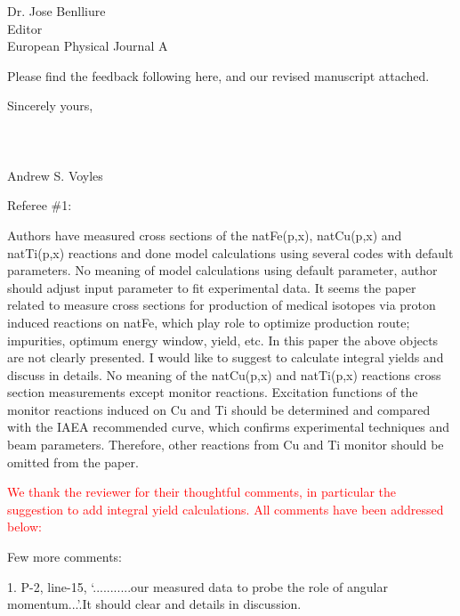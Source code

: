 \documentclass{letter} %
\newcommand{\colornote}[1]{\textcolor{red}{#1}}
\begin{document}
\begin{letter}{Dr. Jose Benlliure \\
Editor \\
European Physical Journal A}
  
  
  Please find the feedback following here, and our revised manuscript attached. 
  
  Sincerely yours,\\ \\ \\ \\ Andrew S. Voyles
 

  \vfill
  
 \pagebreak
 
 
 
 Referee \#1:
 
Authors have measured cross sections of the natFe(p,x), natCu(p,x) and natTi(p,x) reactions and done
model calculations using several codes with default parameters. No meaning of model calculations using
default parameter, author should adjust input parameter to fit experimental data.
It seems the paper related to measure cross sections for production of medical isotopes via proton
induced reactions on natFe, which play role to optimize production route; impurities, optimum energy
window, yield, etc. In this paper the above objects are not clearly presented. I would like to suggest to
calculate integral yields and discuss in details.
No meaning of the natCu(p,x) and natTi(p,x) reactions cross section measurements except monitor
reactions. Excitation functions of the monitor reactions induced on Cu and Ti should be determined and
compared with the IAEA recommended curve, which confirms experimental techniques and beam
parameters. Therefore, other reactions from Cu and Ti monitor should be omitted from the paper.

 \colornote{We thank the reviewer for their thoughtful comments, in particular the suggestion to add integral yield calculations.  All comments have been addressed below:}




Few more comments:

1. P-2, line-15, ‘...........our measured data to probe the role of angular momentum...’.It should
clear and details in discussion.


\end{letter}
\end{document}
